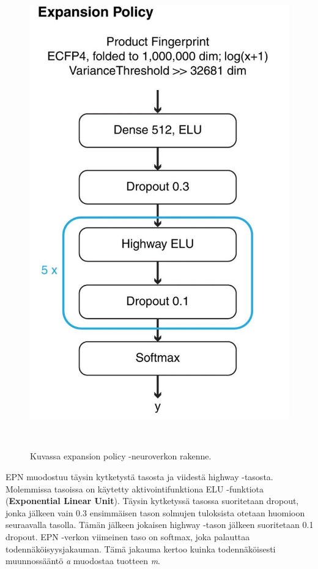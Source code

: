 \documentclass[finnish,twoside,censored,tkt,sw-line]{HYthesisML}
\begin{document}
\begin{figure}[ht]
    \centering
    \includegraphics[]{expansion-policy.jpg}
    \caption{Kuvassa expansion policy -neuroverkon rakenne.}
    {~\cite{SeglerMarwinHS2018Pcsw}}
\end{figure}

EPN muodostuu täysin kytketystä tasosta ja viidestä highway -tasosta.
Molemmissa tasoissa on käytetty aktivointifunktiona ELU -funktiota (\textbf{Exponential Linear Unit}).
Täysin kytketyssä tasossa suoritetaan dropout, jonka jälkeen vain 0.3 ensimmäisen tason solmujen tuloksista otetaan huomioon seuraavalla tasolla.
Tämän jälkeen jokaisen highway -tason jälkeen suoritetaan 0.1 dropout.
EPN -verkon viimeinen taso on softmax, joka palauttaa todennäköisyysjakauman.
Tämä jakauma kertoo kuinka todennäköisesti muunnossääntö \emph{a} muodostaa tuotteen \emph{m}.
\end{document}
